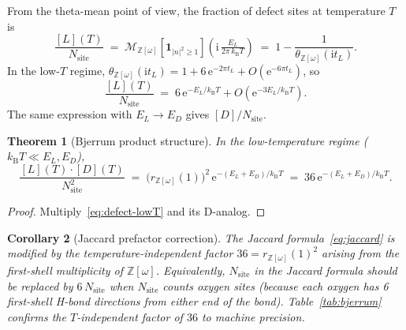 \documentclass[11pt,letterpaper]{article}
\theoremstyle{plain}
\newtheorem{theorem}{Theorem}[section]
\newtheorem{corollary}[theorem]{Corollary}
\theoremstyle{definition}
\newcommand{\Eisenstein}{\mathbb{Z}[\omega]}
\newcommand{\tmeaneis}[1]{\mathcal{M}_{\Eisenstein}[#1]}
\newcommand{\e}{\mathrm{e}}
\newcommand{\kB}{k_{\mathrm{B}}}
\begin{document}
From the theta-mean point of view, the fraction of defect sites at
temperature $T$ is
\begin{equation}\label{eq:defect-tm}
  \frac{[L](T)}{N_{\text{site}}}
  \;=\;
  \tmeaneis{\mathbf{1}_{|n|^2\ge 1}}\!\left(\mathrm{i}\,\tfrac{E_L}{2\pi\,\kB T}\right)
  \;=\;
  1 - \frac{1}{\theta_{\Eisenstein}(\mathrm{i} t_L)}.
\end{equation}
In the low-$T$ regime, $\theta_{\Eisenstein}(\mathrm{i} t_L) = 1 +
6\,\e^{-2\pi t_L} + O(\e^{-6\pi t_L})$, so
\begin{equation}\label{eq:defect-lowT}
  \frac{[L](T)}{N_{\text{site}}}
  \;=\; 6\,\e^{-E_L/\kB T} + O(\e^{-3E_L/\kB T}).
\end{equation}
The same expression with $E_L\to E_D$ gives $[D]/N_{\text{site}}$.

\begin{theorem}[Bjerrum product structure]\label{thm:bjerrum}
In the low-temperature regime ($\kB T \ll E_L, E_D$),
\begin{equation}\label{eq:bjerrum-product}
  \frac{[L](T)\cdot[D](T)}{N_{\text{site}}^2}
  \;=\; \bigl(r_{\Eisenstein}(1)\bigr)^{\!2}\,
         \e^{-(E_L+E_D)/\kB T}
  \;=\; 36\,\e^{-(E_L+E_D)/\kB T}.
\end{equation}
\end{theorem}

\begin{proof}
Multiply~\eqref{eq:defect-lowT} and its D-analog.
\end{proof}

\begin{corollary}[Jaccard prefactor correction]\label{cor:bjerrum}
The Jaccard formula~\eqref{eq:jaccard} is modified by the
temperature-independent factor $36 = r_{\Eisenstein}(1)^2$ arising
from the first-shell multiplicity of $\Eisenstein$.  Equivalently,
$N_{\text{site}}$ in the Jaccard formula should be replaced by
$6\,N_{\text{site}}$ when $N_{\text{site}}$ counts oxygen sites
(because each oxygen has 6 first-shell H-bond directions from
either end of the bond).  Table~\ref{tab:bjerrum} confirms the
$T$-independent factor of $36$ to machine precision.
\end{corollary}
\end{document}

